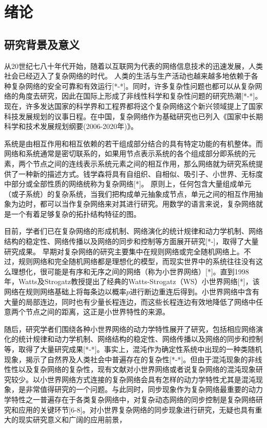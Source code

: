 \chapter{绪论}
\section{研究背景及意义}
从20世纪七八十年代开始，随着以互联网为代表的网络信息技术的迅速发展，人类社会已经迈入了复杂网络的时代。
人类的生活与生产活动也越来越多地依赖于各种复杂网络的安全可靠和有效运行[*-*]。同时，许多复杂性问题也都可以从复杂网络的角度去研究，因此在国际上形成了非线性科学和复杂性问题的研究热潮[*-*]。
现在，许多发达国家的科学界和工程界都将这个复杂网络这个新兴领域提上了国家科技发展规划的议事日程。在中国，复杂网络作为基础研究也已列入《国家中长期科学和技术发展规划纲要(2006-2020年)》。

系统是由相互作用和相互依赖的若干组成部分结合的具有特定功能的有机整体。而网络和系统通常是密切联系的，如果用节点表示系统的各个组成部分即系统的元素，两个节点之间的连线表示系统元素之间的相互作用，那么网络就为研究系统提供了一种新的描述方式。钱学森将具有自组织、自相似、吸引子、小世界、无标度中部分或全部性质的网络统称为复杂网络[*]。
原则上，任何包含大量组成单元（或子系统）的复杂系统，当我们把构成单元抽象成节点，单元之间的相互作用抽象为边时，都可以当作复杂网络来对其进行研究。用数学的语言来说，复杂网络就是一个有着足够复杂的拓扑结构特征的图。

目前，学者们已在复杂网络的形成机制、网络演化的统计规律和动力学机制、网络结构的稳定性、网络传播以及网络的同步和控制等方面展开研究[*-]，取得了大量研究成果。
早期对复杂网络的研究主要集中在规则网络或完全随机网络上。不过，规则网络和完全随机网络都是理想化的模型，而现实世界中的系统往往没有这么理想化，很可能是有序和无序之间的网络（称为小世界网络）[*]。直到1998年，Watts及Strogatz教授提出了经典的Watts-Strogatz（WS）小世界网络[*]，该网络在规则网络基础上将每条边以概率$p$进行断边重连后得到。小世界网络中含有大量的局部连边，同时也有少量长程连边，而这些长程连边有效地降低了网络中任意两个节点之间的距离，这正是小世界特性的来源。

随后，研究学者们围绕各种小世界网络的动力学特性展开了研究，包括相应网络演化的统计规律和动力学机制、网络结构的稳定性、网络传播以及网络的同步和控制等，取得了大量研究成果[*-*]。事实上，混沌作为确定性系统中出现的一种类随机现象，揭示了自然界及人类社会中普遍存在的复杂性[*-*]。但由于混沌现象的非线性性以及复杂网络的复杂性，现有文献对小世界网络或者说复杂网络的混沌现象研究较少。以小世界网络方式连接的复杂网络会具有怎样的动力学特性尤其是混沌现象，是非常值得研究的一个问题。与此同时，同步现象作为复杂网络最重要的动力学特性之一普遍存在于各类复杂网络中，对复杂动态网络的同步控制是复杂网络研究和应用的关键环节[6-8]。对小世界复杂网络的同步现象进行研究，无疑也具有重大的现实研究意义和广阔的应用前景，

